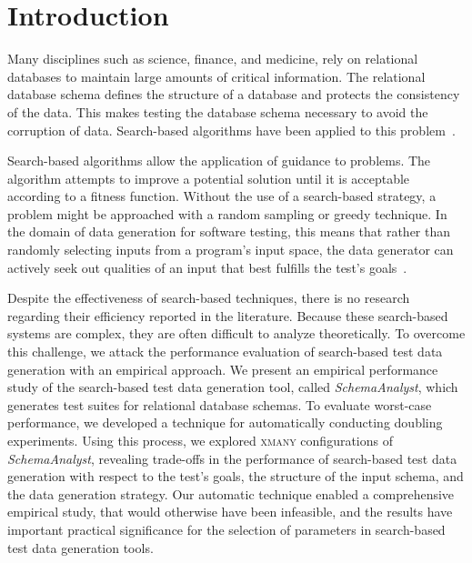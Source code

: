 
\section{Introduction}


Many disciplines such as science, finance, and medicine, rely on relational databases to maintain large amounts of
critical information. The relational database schema defines the structure of a database and protects the consistency of
the data. This makes testing the database schema necessary to avoid the corruption of data. Search-based algorithms have
been applied to this problem~\cite{Kapfhammer2013}.


Search-based algorithms allow the application of guidance to problems. The algorithm attempts to improve a potential
solution until it is acceptable according to a fitness function. Without the use of a search-based strategy, a problem
might be approached with a random sampling or greedy technique. In the domain of data generation for software testing,
this means that rather than randomly selecting inputs from a program’s input space, the data generator can actively seek
out qualities of an input that best fulfills the test’s goals~\cite{McMinn2004a}.

Despite the effectiveness of search-based techniques, there is no research regarding their efficiency reported in the
literature. Because these search-based systems are complex, they are often difficult to analyze theoretically. To
overcome this challenge, we attack the performance evaluation of search-based test data generation with an empirical
approach. We present an empirical performance study of the search-based test data generation tool, called
\textit{SchemaAnalyst}, which generates test suites for relational database schemas. To evaluate worst-case performance,
we developed a technique for automatically conducting doubling experiments. Using this process, we explored
\textsc{xmany} configurations of \textit{SchemaAnalyst}, revealing trade-offs in the performance of search-based test
data generation with respect to the test’s goals, the structure of the input schema, and the data generation strategy.
Our automatic technique enabled a comprehensive empirical study, that would otherwise have been infeasible, and the
results have important practical significance for the selection of parameters in search-based test data generation
tools.

